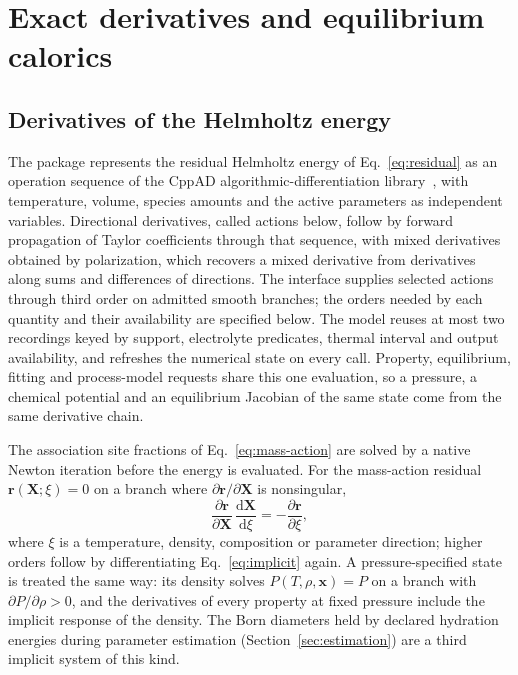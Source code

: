 \section{Exact derivatives and equilibrium calorics}
\label{sec:derivatives}
\subsection{Derivatives of the Helmholtz energy}
The package represents the residual Helmholtz energy of Eq.~\eqref{eq:residual} as an operation sequence of the CppAD algorithmic-differentiation library~\citep{bellCppADPackageAlgorithmic2025}, with temperature, volume, species amounts and the active parameters as independent variables.
Directional derivatives, called actions below, follow by forward propagation of Taylor coefficients through that sequence, with mixed derivatives obtained by polarization, which recovers a mixed derivative from derivatives along sums and differences of directions.
The interface supplies selected actions through third order on admitted smooth branches; the orders needed by each quantity and their availability are specified below.
The model reuses at most two recordings keyed by support, electrolyte predicates, thermal interval and output availability, and refreshes the numerical state on every call.
Property, equilibrium, fitting and process-model requests share this one evaluation, so a pressure, a chemical potential and an equilibrium Jacobian of the same state come from the same derivative chain.

The association site fractions of Eq.~\eqref{eq:mass-action} are solved by a native Newton iteration before the energy is evaluated.
For the mass-action residual $\mathbf{r}(\mathbf{X};\xi)=0$ on a branch where $\partial\mathbf{r}/\partial\mathbf{X}$ is nonsingular,
\begin{equation}
\frac{\partial\mathbf{r}}{\partial\mathbf{X}}\,\frac{\mathrm{d}\mathbf{X}}{\mathrm{d}\xi}=-\frac{\partial\mathbf{r}}{\partial\xi},
\label{eq:implicit}
\end{equation}
where $\xi$ is a temperature, density, composition or parameter direction; higher orders follow by differentiating Eq.~\eqref{eq:implicit} again.
A pressure-specified state is treated the same way: its density solves $P(T,\rho,\mathbf{x})=P$ on a branch with $\partial P/\partial\rho>0$, and the derivatives of every property at fixed pressure include the implicit response of the density.
The Born diameters held by declared hydration energies during parameter estimation (Section~\ref{sec:estimation}) are a third implicit system of this kind.

